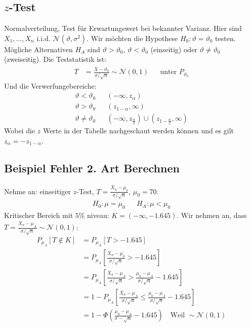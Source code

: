\documentclass[8pt]{extarticle}
\newcommand{\vt}{\vartheta}
\newcommand{\zufallsvariablen}{X_1, \dots, X_n}
\newcommand{\Standardnormalverteilt}{\mathcal{N}  (0, 1)}
\begin{document}
\begin{multicols*}{3}
  \subsection*{$z$-Test}
  Normalverteilung, Test für Erwartungswert bei bekannter Varianz. Hier sind
  $\zufallsvariablen$ i.i.d. $\mathcal{N} (\vt, \sigma^2)$. Wir möchten die
  Hypothese $H_0 : \vt = \vt_0$ testen. Mögliche Alternativen $H_A$ sind $\vt >
    \vt_0$, $\vt < \vt_0$  (einseitig) oder $\vt \neq \vt_0$  (zweiseitig). Die
  Teststatistik ist:
  \begin{align*}
    T & = \frac{\overline{X} - \vt_0}{\sigma / \sqrt{n}} \sim \Standardnormalverteilt
      &                                                                               & \text{unter } P_{\vt_0}
  \end{align*}
  Und die Verwerfungebereiche:
  \begin{align*}
    \vt < \vt_0    &  &  (-\infty, z_\alpha)                                                     \\
    \vt > \vt_0    &  &  (z_{1 - \alpha}, \infty)                                                \\
    \vt \neq \vt_0 &  &  (-\infty, z_{\frac{\alpha}{2}}) \cup  (z_{1 - \frac{\alpha}{2}}, \infty)
  \end{align*}
  Wobei die $z$ Werte in der Tabelle nachgeschaut werden können
  und es gilt $z_\alpha = - z_{1 - \alpha}$.
  \subsection*{Beispiel Fehler 2. Art Berechnen}
  Nehme an: einseitiger $z$-Test, $T = \frac{\overline{X}_n - \mu_0}{\sigma /
      \sqrt{n}}$, $\mu_0 = 70$.
  \begin{align*}
    H_0 : \mu = \mu_0 &  & H_A : \mu < \mu_0
  \end{align*}
  Kritischer Bereich mit $5$\% niveau: $K =  (- \infty, -1.645)$. Wir
  nehmen an, dass $T = \frac{\overline{X}_n - \mu_A}{\sigma / \sqrt{n}} \sim \Standardnormalverteilt$:
  \begin{align*}
    P_{\mu_A}[T \not \in K]
     & = P_{\mu_A}[T > -1.645]                                                                                                            \\
     & = P_{\mu_A} \left[\frac{\overline{X}_n - \mu_0}{\sigma / \sqrt{n}} > -1.645 \right]                                                \\
     & = P_{\mu_A} \left[\frac{\overline{X}_n - \mu_A}{\sigma / \sqrt{n}} > \frac{\mu_0 - \mu_A}{\sigma / \sqrt{n}} -1.645 \right]        \\
     & = 1 - P_{\mu_A} \left[\frac{\overline{X}_n - \mu_A}{\sigma / \sqrt{n}} \leq \frac{\mu_0 - \mu_A}{\sigma / \sqrt{n}} -1.645 \right] \\
     & = 1 - \Phi \left( \frac{\mu_0 - \mu_A}{\sigma - \sqrt{n}} - 1.645 \right)       \quad \text{Weil } \sim \Standardnormalverteilt
  \end{align*}

\end{multicols*}
\end{document}
